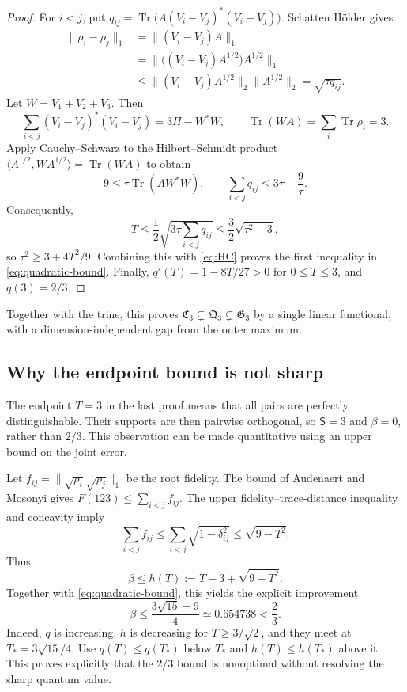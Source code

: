 \documentclass[10pt,a4paper]{amsart}
\newcommand{\Tr}{\operatorname{Tr}}
\newcommand{\1}{\mathbf 1}
\newcommand{\Creg}{\mathfrak C}
\newcommand{\Qreg}{\mathfrak Q}
\newcommand{\Greg}{\mathfrak G}
\newcommand{\Sopt}{\mathsf S}
\begin{document}
\begin{proof}
For $i<j$, put
$q_{ij}=\Tr\bigl(A(V_i-V_j)^*(V_i-V_j)\bigr)$. Schatten H\"older gives
\begin{align}
 \|\rho_i-\rho_j\|_1
 &=\|(V_i-V_j)A\|_1\nonumber\\
 &=\|\bigl((V_i-V_j)A^{1/2}\bigr)A^{1/2}\|_1\nonumber\\
 &\le\|(V_i-V_j)A^{1/2}\|_2\|A^{1/2}\|_2
 =\sqrt{\tau q_{ij}}.\label{eq:holder}
\end{align}
Let $W=V_1+V_2+V_3$. Then
\[
 \sum_{i<j}(V_i-V_j)^*(V_i-V_j)=3\Pi-W^*W,
 \qquad\Tr(WA)=\sum_i\Tr\rho_i=3.
\]
Apply Cauchy--Schwarz to the Hilbert--Schmidt product
$\langle A^{1/2},WA^{1/2}\rangle=\Tr(WA)$ to obtain
\[
 9\le\tau\Tr(AW^*W),\qquad
 \sum_{i<j}q_{ij}\le3\tau-\frac9\tau.
\]
Consequently,
\[
 T\le\frac12\sqrt{3\tau\sum_{i<j}q_{ij}}
 \le\frac32\sqrt{\tau^2-3},
\]
so $\tau^2\ge3+4T^2/9$. Combining this with \eqref{eq:HC} proves the first
inequality in \eqref{eq:quadratic-bound}. Finally,
$q'(T)=1-8T/27>0$ for $0\le T\le3$, and $q(3)=2/3$.
\end{proof}

Together with the trine, this proves
$\Creg_3\subsetneq\Qreg_3\subsetneq\Greg_3$ by a single linear functional,
with a dimension-independent gap from the outer maximum.

\subsection{Why the endpoint bound is not sharp}

The endpoint $T=3$ in the last proof means that all pairs are perfectly
distinguishable. Their supports are then pairwise orthogonal, so
$\Sopt=3$ and $\beta=0$, rather than $2/3$. This observation can be made
quantitative using an upper bound on the joint error.

Let $f_{ij}=\|\sqrt{\rho_i}\sqrt{\rho_j}\|_1$ be the root fidelity. The bound of
Audenaert and Mosonyi \cite[Theorem~3.1]{AudenaertMosonyi2014} gives
$F(123)\le\sum_{i<j}f_{ij}$. The upper fidelity--trace-distance inequality and
concavity imply
\[
 \sum_{i<j}f_{ij}
 \le\sum_{i<j}\sqrt{1-\delta_{ij}^2}
 \le\sqrt{9-T^2}.
\]
Thus
\begin{equation}\label{eq:AM-beta}
 \beta\le h(T):=T-3+\sqrt{9-T^2}.
\end{equation}
Together with \eqref{eq:quadratic-bound}, this yields the explicit improvement
\begin{equation}\label{eq:AM-refinement}
 \beta\le\frac{3\sqrt{15}-9}{4}\simeq0.654738<\frac23.
\end{equation}
Indeed, $q$ is increasing, $h$ is decreasing for $T\ge3/\sqrt2$, and they meet
at $T_*=3\sqrt{15}/4$. Use $q(T)\le q(T_*)$ below $T_*$ and
$h(T)\le h(T_*)$ above it. This proves explicitly that the $2/3$ bound is
nonoptimal without resolving the sharp quantum value.
\end{document}
